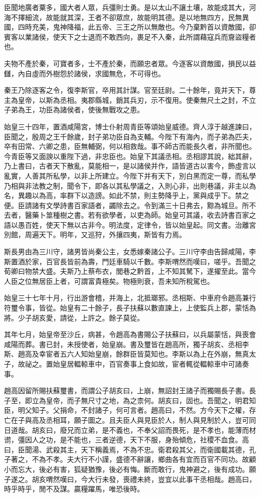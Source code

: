 臣聞地廣者粟多，國大者人眾，兵彊則士勇。是以太山不讓土壤，故能成其大，河海不擇細流，故能就其深，王者不卻眾庶，故能明其德。是以地無四方，民無異國，四時充美，鬼神降福，此五帝、三王之所以無敵也。今乃棄黔首以資敵國，卻賓客以業諸侯，使天下之士退而不敢西向，裹足不入秦，此所謂藉寇兵而齎盜糧者也。

夫物不產於秦，可寶者多，士不產於秦，而願忠者眾。今逐客以資敵國，損民以益讎，內自虛而外樹怨於諸侯，求國無危，不可得也。

秦王乃除逐客之令，復李斯官，卒用其計謀。官至廷尉。二十餘年，竟并天下，尊主為皇帝，以斯為丞相。夷郡縣城，銷其兵刃，示不復用。使秦無尺土之封，不立子弟為王，功臣為諸侯者，使後無戰攻之患。

始皇三十四年，置酒咸陽宮，博士仆射周青臣等頌始皇威德。齊人淳于越進諫曰，臣聞之，殷周之王千餘歲，封子弟功臣自為支輔。今陛下有海內，而子弟為匹夫，卒有田常、六卿之患，臣無輔弼，何以相救哉。事不師古而能長久者，非所聞也。今青臣等又面諛以重陛下過，非忠臣也。始皇下其議丞相。丞相謬其說，絀其辭，乃上書曰，古者天下散亂，莫能相一，是以諸侯并作，語皆道古以害今，飾虛言以亂實，人善其所私學，以非上所建立。今陛下并有天下，別白黑而定一尊，而私學乃相與非法教之制，聞令下，即各以其私學議之，入則心非，出則巷議，非主以為名，異趣以為高，率群下以造謗。如此不禁，則主勢降乎上，黨與成乎下。禁之便。臣請諸有文學詩書百家語者，蠲除去之。令到滿三十日弗去，黥為城旦。所不去者，醫藥卜筮種樹之書。若有欲學者，以吏為師。始皇可其議，收去詩書百家之語以愚百姓，使天下無以古非今。明法度，定律令，皆以始皇起。同文書。治離宮別館，周遍天下。明年，又巡狩，外攘四夷，斯皆有力焉。

斯長男由為三川守，諸男皆尚秦公主，女悉嫁秦諸公子。三川守李由告歸咸陽，李斯置酒於家，百官長皆前為壽，門廷車騎以千數。李斯喟然而嘆曰，嗟乎。吾聞之荀卿曰物禁大盛。夫斯乃上蔡布衣，閭巷之黔首，上不知其駑下，遂擢至此。當今人臣之位無居臣上者，可謂富貴極矣。物極則衰，吾未知所稅駕也。

始皇三十七年十月，行出游會稽，并海上，北抵瑯邪。丞相斯、中車府令趙高兼行符璽令事，皆從。始皇有二十餘子，長子扶蘇以數直諫上，上使監兵上郡，蒙恬為將。少子胡亥愛，請從，上許之。餘子莫從。

其年七月，始皇帝至沙丘，病甚，令趙高為書賜公子扶蘇曰，以兵屬蒙恬，與喪會咸陽而葬。書已封，未授使者，始皇崩。書及璽皆在趙高所，獨子胡亥、丞相李斯、趙高及幸宦者五六人知始皇崩，餘群臣皆莫知也。李斯以為上在外崩，無真太子，故祕之。置始皇居輼輬車中，百官奏事上食如故，宦者輒從輼輬車中可諸奏事。

趙高因留所賜扶蘇璽書，而謂公子胡亥曰，上崩，無詔封王諸子而獨賜長子書。長子至，即立為皇帝，而子無尺寸之地，為之柰何。胡亥曰，固也。吾聞之，明君知臣，明父知子。父捐命，不封諸子，何可言者。趙高曰，不然。方今天下之權，存亡在子與高及丞相耳，願子圖之。且夫臣人與見臣於人，制人與見制於人，豈可同日道哉。胡亥曰，廢兄而立弟，是不義也，不奉父詔而畏死，是不孝也，能薄而材谫，彊因人之功，是不能也，三者逆德，天下不服，身殆傾危，社稷不血食。高曰，臣聞湯、武殺其主，天下稱義焉，不為不忠。衛君殺其父，而衛國載其德，孔子著之，不為不孝。夫大行不小謹，盛德不辭讓，鄉曲各有宜而百官不同功。故顧小而忘大，後必有害，狐疑猶豫，後必有悔。斷而敢行，鬼神避之，後有成功。願子遂之。胡亥喟然嘆曰，今大行未發，喪禮未終，豈宜以此事干丞相哉。趙高曰，時乎時乎，閒不及謀。贏糧躍馬，唯恐後時。


